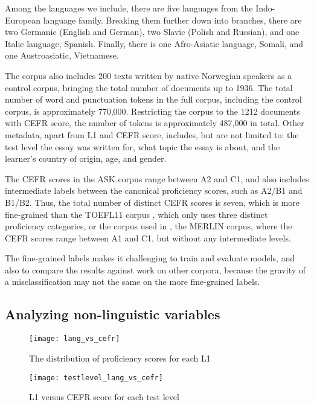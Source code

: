 Among the languages we include, there are five languages from the
Indo-European language family. Breaking them further down into branches,
there are two Germanic (English and German), two Slavic (Polish and Russian),
and one Italic language, Spanish. Finally, there is one Afro-Asiatic
language, Somali, and one Austroasiatic, Vietnamese.

The corpus also includes 200 texts written by native Norwegian speakers as a
control corpus, bringing the total number of documents up to 1936. The total
number of word and punctuation tokens in the full corpus, including the
control corpus, is approximately 770,000. Restricting the corpus to the 1212
documents with \ac{CEFR} score, the number of tokens is approximately 487,000
in total. Other metadata, apart from L1 and CEFR score, includes, but are not
limited to: the test level the essay was written for, what topic the essay
is about, and the learner's country of origin, age, and gender.

The CEFR scores in the ASK corpus range between A2 and C1, and also includes
intermediate labels between the canonical proficiency scores, such as A2/B1
and B1/B2. Thus, the total number of distinct CEFR scores is seven, which is
more fine-grained than the TOEFL11 corpus \autocite{blanchard13}, which only
uses three distinct proficiency categories, or the corpus used in
\textcite{vajjala18universalCEFR}, the MERLIN corpus, where the CEFR scores
range between A1 and C1, but without any intermediate levels.

The fine-grained labels makes it challenging to train and evaluate models,
and also to compare the results against work on other corpora, because the
gravity of a misclassification may not the same on the more fine-grained
labels.
 

\subsection{Analyzing non-linguistic variables}

\begin{figure}
  \centering
  \texttt{[image: lang\_vs\_cefr]}
  \caption{The distribution of proficiency scores for each L1}
  \label{fig:lang-vs-cefr}
\end{figure}
 
\begin{figure}
  \centering
  \texttt{[image: testlevel\_lang\_vs\_cefr]}
  \caption{L1 versus CEFR score for each test level}
  \label{fig:testlevel-lang-vs-cefr}
\end{figure}


